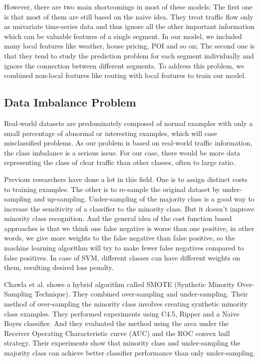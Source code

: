 However, there are two main shortcomings in most of these models: 
The first one is that most of them are still based on the naive idea. 
They treat traffic flow only as univariate time-series data 
and thus ignore all the other important information 
which can be valuable features of a single segment. 
In our model, we included many local features like weather, 
house pricing, POI and so on; The second one is that they 
tend to study the prediction problem for each segment individually 
and ignore the connection between different segments. 
To address this problem, we combined non-local features like 
routing with local features to train our model.

\subsection{Data Imbalance Problem}
Real-world datasets are predominately composed of normal examples with only a small percentage of abnormal or interesting examples, which will case misclassified problems. As our problem is based on real-world traffic information, the class imbalance is a serious issue. For our case, there would be more data representing the class of clear traffic than other classes, often to large ratio. 

Previous researchers have done a lot in this field. One is to assign distinct costs to training examples. The other is to re-sample the original dataset by under-sampling and up-sampling. Under-sampling of the majority class is a good way to increase the sensitivity of a classifier to the minority class. But it doesn't improve minority class recognition. And the general idea of the cost function based approaches is that we think one false negative is worse than one positive, in other words, we give more weights to the false negative than false positive, so the machine learning algorithm will try to make fewer false negatives compared to false positives. In case of SVM, different classes can have different weights on them, resulting desired loss penalty.


Chawla et al. \cite{Chawla2011SMOTE} shows a hybrid algorithm called SMOTE (Synthetic Minority Over-Sampling Technique). They combined over-sampling and under-sampling. Their method of over-sampling the minority class involves creating synthetic minority class examples. They performed experiments using C4.5, Ripper and a Naive Bayes classifier. And they evaluated the method using the area under the Receiver Operating Characteristic curve (AUC) and the ROC convex hull strategy. Their experiments show that minority class and under-sampling the majority class can achieve better classifier performance than only under-sampling.


